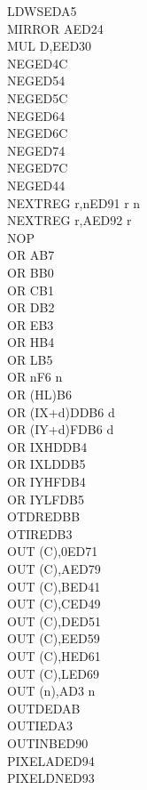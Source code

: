 \documentclass[12pt,twoside,openright,a4paper]{book}
\begin{document}
\begin{multicols}{3}
{\begin{tabbing}
		LDWS\ZXN\>EDA5\\
		MIRROR A\ZXN\>ED24\\
		MUL D,E\ZXN\>ED30\\
		NEG\UNDOC\>ED4C\\
		NEG\UNDOC\>ED54\\
		NEG\UNDOC\>ED5C\\
		NEG\UNDOC\>ED64\\
		NEG\UNDOC\>ED6C\\
		NEG\UNDOC\>ED74\\
		NEG\UNDOC\>ED7C\\
		NEG\>ED44\\
		NEXTREG r,n\ZXN\>ED91 r n\\
		NEXTREG r,A\ZXN\>ED92 r\\
		NOP\\
		OR A\>B7\\
		OR B\>B0\\
		OR C\>B1\\
		OR D\>B2\\
		OR E\>B3\\
		OR H\>B4\\
		OR L\>B5\\
		OR n\>F6 n\\
		OR (HL)\>B6\\
		OR (IX+d)\>DDB6 d\\
		OR (IY+d)\>FDB6 d\\
		OR IXH\UNDOC\>DDB4\\
		OR IXL\UNDOC\>DDB5\\
		OR IYH\UNDOC\>FDB4\\
		OR IYL\UNDOC\>FDB5\\
		OTDR\>EDBB\\
		OTIR\>EDB3\\
		OUT (C),0\UNDOC\>ED71\\
		OUT (C),A\>ED79\\
		OUT (C),B\>ED41\\
		OUT (C),C\>ED49\\
		OUT (C),D\>ED51\\
		OUT (C),E\>ED59\\
		OUT (C),H\>ED61\\
		OUT (C),L\>ED69\\
		OUT (n),A\>D3 n\\
		OUTD\>EDAB\\
		OUTI\>EDA3\\
		OUTINB\ZXN\>ED90\\
		PIXELAD\ZXN\>ED94\\
		PIXELDN\ZXN\>ED93\\

\end{tabbing}}
\end{multicols}
\end{document}
